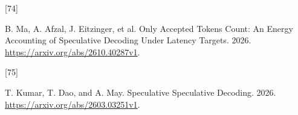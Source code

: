 \documentclass[
  a4paper,
  UTF8,
  fontset=none,
  zihao=5]{ctexart}
\newlength{\cslhangindent}
\newlength{\csllabelwidth}
\newenvironment{CSLReferences}[2] %
 {\begin{list}{}{%
  \setlength{\itemindent}{0pt}
  \setlength{\leftmargin}{0pt}
  \setlength{\parsep}{0pt}
  \ifodd #1
   \setlength{\leftmargin}{\cslhangindent}
   \setlength{\itemindent}{-1\cslhangindent}
  \fi
  \setlength{\itemsep}{#2\baselineskip}}}
 {\end{list}}
\newcommand{\CSLLeftMargin}[1]{\parbox[t]{\csllabelwidth}{\strut#1\strut}}
\newcommand{\CSLRightInline}[1]{\parbox[t]{\linewidth - \csllabelwidth}{\strut#1\strut}}
\begin{document}
\begin{CSLReferences}{0}{0}
\CSLLeftMargin{{[}74{]} }%
\CSLRightInline{B. Ma, A. Afzal, J. Eitzinger, et al. {Only Accepted
Tokens Count: An Energy Accounting of Speculative Decoding Under Latency
Targets}. 2026. \url{https://arxiv.org/abs/2610.40287v1}.}

\CSLLeftMargin{{[}75{]} }%
\CSLRightInline{T. Kumar, T. Dao, and A. May. {Speculative Speculative
Decoding}. 2026. \url{https://arxiv.org/abs/2603.03251v1}.}

\end{CSLReferences}
\end{document}
